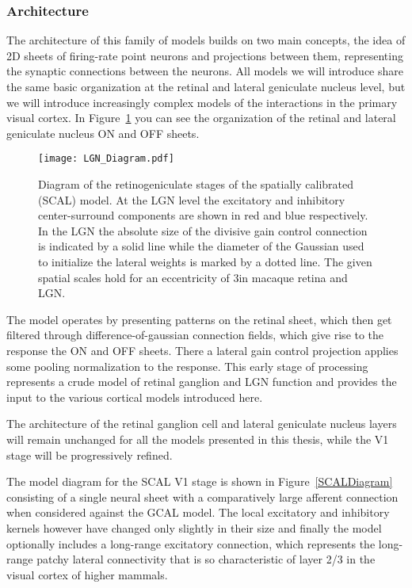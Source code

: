 \subsubsection{Architecture}

The architecture of this family of models builds on two main concepts,
the idea of 2D sheets of firing-rate point neurons and projections
between them, representing the synaptic connections between the
neurons. All models we will introduce share the same basic
organization at the retinal and lateral geniculate nucleus level, but
we will introduce increasingly complex models of the interactions in
the primary visual cortex. In Figure~\ref{LGNDiagram} you can see the
organization of the retinal and lateral geniculate nucleus ON and OFF
sheets.

\begin{figure}
	\centering
        \texttt{[image: LGN\_Diagram.pdf]}
	\caption[Diagram of the SCAL retinogeniculate stage.]{Diagram of
      the retinogeniculate stages of the spatially calibrated (SCAL)
      model. At the LGN level the excitatory and inhibitory
      center-surround components are shown in red and blue
      respectively. In the LGN the absolute size of the divisive gain
      control connection is indicated by a solid line while the
      diameter of the Gaussian used to initialize the lateral weights
      is marked by a dotted line. The given spatial scales hold for an
      eccentricity of 3\degree in macaque retina and LGN.}
	\label{LGNDiagram}
\end{figure}

The model operates by presenting patterns on the retinal sheet, which
then get filtered through difference-of-gaussian connection fields,
which give rise to the response the ON and OFF sheets. There a lateral
gain control projection applies some pooling normalization to the
response. This early stage of processing represents a crude model of
retinal ganglion and LGN function and provides the input to the
various cortical models introduced here.

The architecture of the retinal ganglion cell and lateral geniculate
nucleus layers will remain unchanged for all the models presented in
this thesis, while the V1 stage will be progressively refined.

The model diagram for the SCAL V1 stage is shown in
Figure~\ref{SCALDiagram} consisting of a single neural sheet with a
comparatively large afferent connection when considered against the
GCAL model. The local excitatory and inhibitory kernels however have
changed only slightly in their size and finally the model optionally
includes a long-range excitatory connection, which represents the
long-range patchy lateral connectivity that is so characteristic of
layer 2/3 in the visual cortex of higher mammals.

